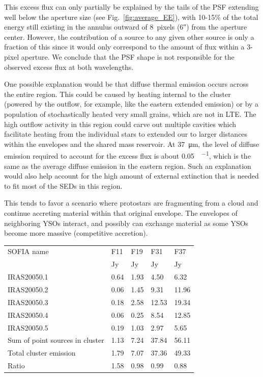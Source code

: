 This excess flux can only partially be explained by the tails of the PSF extending well below the aperture size (see Fig.~\ref{fig:average_EE}), with 10-15\% of the total energy still existing in the annulus outward of 8~pixels (\ang{;;6}) from the aperture center. However, the contribution of a source to any given other source is only a fraction of this since it would only correspond to the amount of flux within a 3-pixel aperture. We conclude that the PSF shape is not responsible for the observed excess flux at both wavelengths.

One possible explanation would be that diffuse thermal emission occurs across the entire region. This could be caused by heating internal to the cluster (powered by the outflow, for example, like the eastern extended emission) or by a population of stochastically heated very small grains, which are not in LTE. The high outflow activity in this region could carve out multiple cavities which facilitate heating from the individual stars to extended our to larger distances within the envelopes and the shared mass reservoir. At \SI{37}{\um}, the level of diffuse emission required to account for the excess flux is about \SI{0.05}{\Jy\per\pixel}, which is the same as the average diffuse emission in the eastern region. Such an explanation would also help account for the high amount of external extinction that is needed to fit most of the SEDs in this region.

This tends to favor a scenario where protostars are fragmenting from a cloud and continue accreting material within that original envelope. The envelopes of neighboring YSOs interact, and possibly can exchange material as some YSOs become more massive (competitive accretion). 

\renewcommand{\arraystretch}{1.5}
\def\labelitemi{--}
\begin{table}[!h]
\scriptsize
\caption[Clustered sources in IRAS20050+2720's dense core]{Clustered sources in the densest region of IRAS20050.}
\label{tab:IRAS20050sum}
\vspace{-0.5cm}
\begin{longtable}{lP{2cm}P{2cm}P{2cm}P{2cm}}
\toprule																			
SOFIA name	&	F11	&	F19	&	F31	&	F37	\\
	&	Jy	&	Jy	&	Jy	&	Jy\\
\midrule									
IRAS20050.1	&	0.64	&	1.93	&	4.50	&	6.32	\\
IRAS20050.2	&	0.06	&	1.45	&	9.31	&	11.96	\\
IRAS20050.3	&	0.18	&	2.58	&	12.53	&	19.34	\\
IRAS20050.4	&	0.06	&	0.25	&	8.54	&	12.85	\\
IRAS20050.5	&	0.19	&	1.03	&	2.97	&	5.65	\\
\midrule									
Sum of point sources in cluster	&	1.13	&	7.24	&	37.84	&	56.11	\\
Total cluster emission	&	1.79	&	7.07	&	37.36	&	49.33	\\
Ratio	&	1.58	&	0.98	&	0.99	&	0.88	\\
\bottomrule					
	\end{longtable} 
\end{table}


